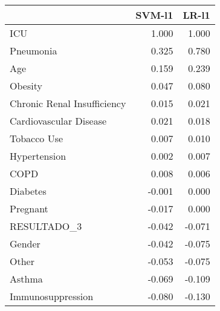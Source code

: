 \begin{tabular}{lrr}
\toprule
{} &  SVM-l1 &  LR-l1 \\
\midrule
ICU                         &   1.000 &  1.000 \\
Pneumonia                   &   0.325 &  0.780 \\
Age                         &   0.159 &  0.239 \\
Obesity                     &   0.047 &  0.080 \\
Chronic Renal Insufficiency &   0.015 &  0.021 \\
Cardiovascular Disease      &   0.021 &  0.018 \\
Tobacco Use                 &   0.007 &  0.010 \\
Hypertension                &   0.002 &  0.007 \\
COPD                        &   0.008 &  0.006 \\
Diabetes                    &  -0.001 &  0.000 \\
Pregnant                    &  -0.017 &  0.000 \\
RESULTADO\_3                 &  -0.042 & -0.071 \\
Gender                      &  -0.042 & -0.075 \\
Other                       &  -0.053 & -0.075 \\
Asthma                      &  -0.069 & -0.109 \\
Immunosuppression           &  -0.080 & -0.130 \\
\bottomrule
\end{tabular}
